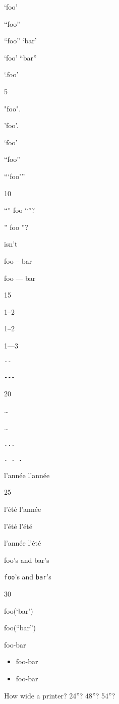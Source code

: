 
\def\mytitle{Smart Quotes}


`foo'

``foo''

``foo'' `bar'

`foo' ``bar''

`.foo'

5

"foo".

'foo'.

`foo'

``foo''

```foo'''

10

``'' foo ``''?

'' foo ''?

isn't

foo -- bar

foo --- bar

15

1--2

1--2

1---3

\texttt{-{}-}

\texttt{-{}-{}-}

20

{\ldots}

{\ldots}

\texttt{...}

\texttt{. . .}

l'année l'année

25

l'été l'année

l'été l'été

l'année l'été

foo's and bar's

\texttt{foo}'s and \texttt{bar}'s

30

foo(`bar')

foo(``bar'')

foo-bar

\begin{itemize}
\item foo-bar

\item foo-bar

\end{itemize}

How wide a printer? 24''? 48''? 54''?



